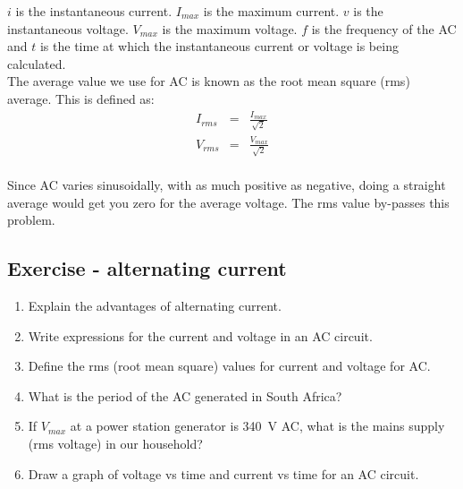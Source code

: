 $i$ is the instantaneous current. $I_{max}$ is the maximum current. $v$ is the instantaneous voltage. $V_{max}$ is the maximum voltage. $f$ is the frequency of the AC and $t$ is the time at which the instantaneous current or voltage is being calculated.\\
The average value we use for AC is known as the root mean square (rms) average. This is defined as:
\begin{eqnarray*}
I_{rms}&=&\frac{I_{max}}{\sqrt{2}}\\
V_{rms}&=&\frac{V_{max}}{\sqrt{2}}
\end{eqnarray*}\\
Since AC varies sinusoidally, with as much positive as negative, doing a straight average would get you zero for the average voltage. The rms value by-passes this problem.

\subsection {Exercise - alternating  current}
\begin{enumerate}
\item Explain the advantages of alternating current.
\item Write expressions for the current and voltage in an AC circuit.
\item Define the rms (root mean square) values for current and voltage for AC.
\item What is the period of the AC generated in South Africa?
\item If $V_{max}$ at a power station generator is 340~V AC, what is the mains supply (rms voltage) in our household?
\item Draw a graph of voltage vs time and current vs time for an AC circuit.
\end{enumerate}

